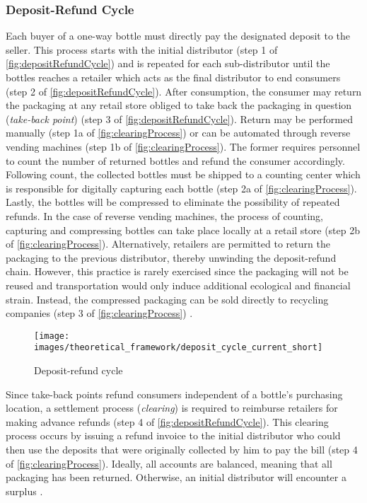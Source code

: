 \subsubsection{Deposit-Refund Cycle}
\label{sec:depositRefundCycle}
Each buyer of a one-way bottle must directly pay the designated deposit to the seller. This process starts with the initial distributor (step 1 of \autoref{fig:depositRefundCycle}) and is repeated for each sub-distributor until the bottles reaches a retailer which acts as the final distributor to end consumers (step 2 of \autoref{fig:depositRefundCycle}). After consumption, the consumer may return the packaging at any retail store obliged to take back the packaging in question (\textit{take-back point}) (step 3 of \autoref{fig:depositRefundCycle}). Return may be performed manually (step 1a of \autoref{fig:clearingProcess}) or can be automated through reverse vending machines (step 1b of \autoref{fig:clearingProcess}). The former requires personnel to count the number of returned bottles and refund the consumer accordingly. Following count, the collected bottles must be shipped to a counting center which is responsible for digitally capturing each bottle (step 2a of \autoref{fig:clearingProcess}). Lastly, the bottles will be compressed to eliminate the possibility of repeated refunds. In the case of reverse vending machines, the process of counting, capturing and compressing bottles can take place locally at a retail store (step 2b of \autoref{fig:clearingProcess}). Alternatively, retailers are permitted to return the packaging to the previous distributor, thereby unwinding the deposit-refund chain. However, this practice is rarely exercised since the packaging will not be reused and transportation would only induce additional ecological and financial strain. Instead, the compressed packaging can be sold directly to recycling companies (step 3 of \autoref{fig:clearingProcess}) \cite[p.~16-17]{Hartlep2011Recycling}.  

\begin{figure}[hbt]
  \centering
  \texttt{[image: images/theoretical\_framework/deposit\_cycle\_current\_short]}
  \caption[Deposit-refund cycle]{Deposit-refund cycle \cite[p.~14]{Hartlep2011Recycling}}
  \label{fig:depositRefundCycle}
\end{figure}

Since take-back points refund consumers independent of a bottle’s purchasing location, a settlement process (\textit{clearing}) is required to reimburse retailers for making advance refunds (step 4 of \autoref{fig:depositRefundCycle}). This clearing process occurs by issuing a refund invoice to the initial distributor who could then use the deposits that were originally collected by him to pay the bill (step 4 of \autoref{fig:clearingProcess}). Ideally, all accounts are balanced, meaning that all packaging has been returned. Otherwise, an initial distributor will encounter a surplus \cite[p.~17]{Hartlep2011Recycling}.

